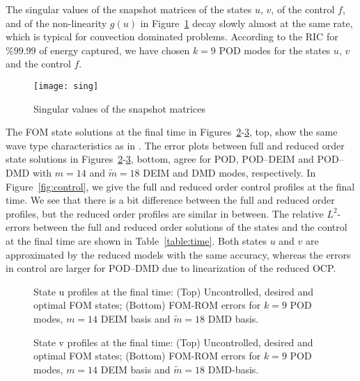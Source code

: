 \documentclass[preprint,12pt]{elsarticle}
\begin{document}
The singular values of the snapshot matrices of the states $u$, $v$, of the control $f$, and of the non-linearity $g(u)$ in Figure~\ref{fig:sing} decay slowly almost at the same rate, which is typical for convection dominated problems. According to the RIC for $\%99.99$ of energy captured,  we have chosen $k=9$ POD modes for the states $u$, $v$ and the control $f$.

\begin{figure}[H]
\centering
   \texttt{[image: sing]}
   \caption{Singular values of the snapshot matrices}
   \label{fig:sing}
\end{figure}


The FOM state solutions at the final time in Figures~\ref{fig:states_u}-\ref{fig:states_v}, top, show the same wave type characteristics  as in \cite{Uzunca17}. The error plots between full and reduced order state solutions in Figures~\ref{fig:states_u}-\ref{fig:states_v}, bottom, agree for POD, POD--DEIM and POD--DMD with $m=14$ and $\widetilde{m}=18$ DEIM and DMD modes, respectively. In Figure~\ref{fig:control}, we give the full and reduced order control profiles at the final time. We see that there is a bit difference between the full and reduced order profiles, but the reduced order profiles are similar in between. The relative $L^2$-errors between the full and reduced order solutions of the states and the control at the final time are shown in Table~\ref{table:time}. Both states $u$ and $v$ are approximated by the reduced models with the same accuracy, whereas the errors in control are larger for POD--DMD due to linearization of the reduced OCP.

\begin{figure}[htb]
\centering

   \caption{State u profiles at the final time: (Top) Uncontrolled, desired and optimal FOM states; (Bottom) FOM-ROM errors for $k=9$ POD modes, $m=14$ DEIM basis and $\widetilde{m}=18$ DMD basis.}
   \label{fig:states_u}
\end{figure}

\begin{figure}[htb]
\centering

   \caption{State v profiles at the final time: (Top) Uncontrolled, desired and optimal FOM states; (Bottom) FOM-ROM errors for $k=9$ POD modes, $m=14$ DEIM basis and $\widetilde{m}=18$ DMD-basis.}
   \label{fig:states_v}
\end{figure}
\end{document}
